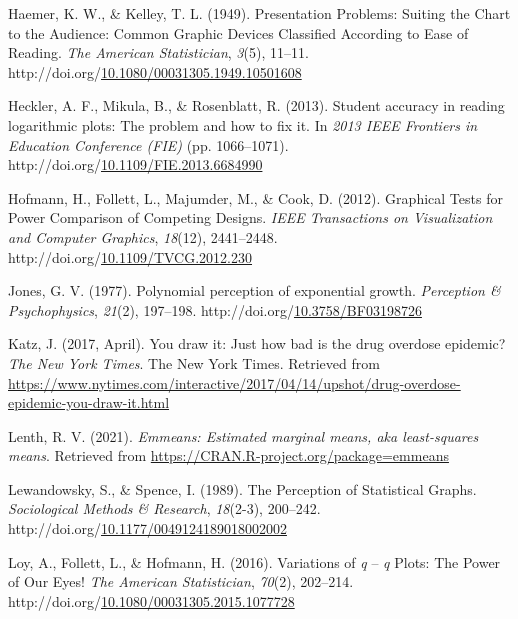 \documentclass[print]{nuthesis}
\newlength{\cslhangindent}
\newenvironment{CSLReferences}%
{\setlength{\parindent}{0pt}%
\everypar{\setlength{\hangindent}{\cslhangindent}}\ignorespaces}%
{\par}
\begin{document}
\begin{CSLReferences}{1}{0}
\leavevmode\hypertarget{ref-haemer_presentation_1949}{}%
Haemer, K. W., \& Kelley, T. L. (1949). Presentation {Problems}: {Suiting} the {Chart} to the {Audience}: {Common} {Graphic} {Devices} {Classified} {According} to {Ease} of {Reading}. \emph{The American Statistician}, \emph{3}(5), 11--11. http://doi.org/\href{https://doi.org/10.1080/00031305.1949.10501608}{10.1080/00031305.1949.10501608}

\leavevmode\hypertarget{ref-heckler_student_2013}{}%
Heckler, A. F., Mikula, B., \& Rosenblatt, R. (2013). Student accuracy in reading logarithmic plots: {The} problem and how to fix it. In \emph{2013 {IEEE} {Frontiers} in {Education} {Conference} ({FIE})} (pp. 1066--1071). http://doi.org/\href{https://doi.org/10.1109/FIE.2013.6684990}{10.1109/FIE.2013.6684990}

\leavevmode\hypertarget{ref-hofmann_graphical_2012}{}%
Hofmann, H., Follett, L., Majumder, M., \& Cook, D. (2012). Graphical {Tests} for {Power} {Comparison} of {Competing} {Designs}. \emph{IEEE Transactions on Visualization and Computer Graphics}, \emph{18}(12), 2441--2448. http://doi.org/\href{https://doi.org/10.1109/TVCG.2012.230}{10.1109/TVCG.2012.230}

\leavevmode\hypertarget{ref-jones_polynomial_1977}{}%
Jones, G. V. (1977). Polynomial perception of exponential growth. \emph{Perception \& Psychophysics}, \emph{21}(2), 197--198. http://doi.org/\href{https://doi.org/10.3758/BF03198726}{10.3758/BF03198726}

\leavevmode\hypertarget{ref-katz_2017}{}%
Katz, J. (2017, April). You draw it: Just how bad is the drug overdose epidemic? \emph{The New York Times}. The New York Times. Retrieved from \url{https://www.nytimes.com/interactive/2017/04/14/upshot/drug-overdose-epidemic-you-draw-it.html}

\leavevmode\hypertarget{ref-emmeans}{}%
Lenth, R. V. (2021). \emph{Emmeans: Estimated marginal means, aka least-squares means}. Retrieved from \url{https://CRAN.R-project.org/package=emmeans}

\leavevmode\hypertarget{ref-lewandowsky_perception_1989}{}%
Lewandowsky, S., \& Spence, I. (1989). The {Perception} of {Statistical} {Graphs}. \emph{Sociological Methods \& Research}, \emph{18}(2-3), 200--242. http://doi.org/\href{https://doi.org/10.1177/0049124189018002002}{10.1177/0049124189018002002}

\leavevmode\hypertarget{ref-loy_variations_2016}{}%
Loy, A., Follett, L., \& Hofmann, H. (2016). Variations of \emph{q} -- \emph{q} {Plots}: {The} {Power} of {Our} {Eyes}! \emph{The American Statistician}, \emph{70}(2), 202--214. http://doi.org/\href{https://doi.org/10.1080/00031305.2015.1077728}{10.1080/00031305.2015.1077728}


\end{CSLReferences}
\end{document}

